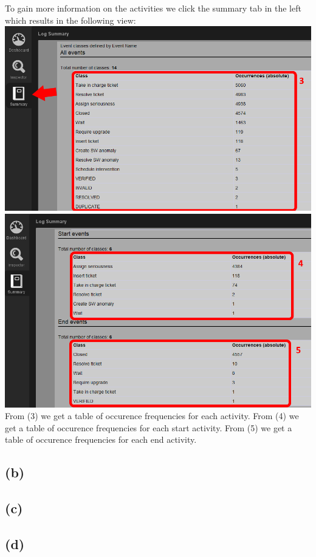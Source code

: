 \documentclass[../../main.tex]{subfiles}
\begin{document}
To gain more information on the activities we click the summary tab in the left which results in the following view:\\
\includegraphics[scale=0.8]{img/ProM_a_summary.png}\\
\includegraphics[scale=0.8]{img/ProM_a_summary_2.png}\\
From (3) we get a table of occurence frequencies for each activity. From (4) we get a table of occurence frequencies for each start activity. From (5) we get a table of occurence frequencies for each end activity.



\subsection*{(b)}
\subsection*{(c)}
\subsection*{(d)}
\end{document}
